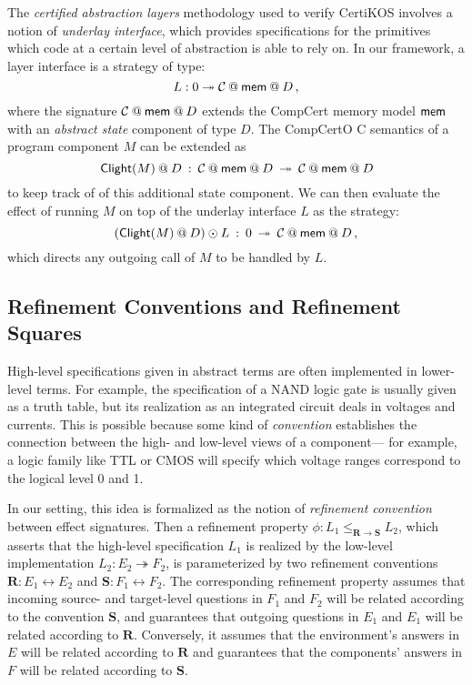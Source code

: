 \begin{example} \label{ex:calcomp} %
The \emph{certified abstraction layers} methodology used to verify CertiKOS
involves a notion of \emph{underlay interface},
which provides specifications for the primitives which
code at a certain level of abstraction is able to rely on.
In our framework, a layer interface is a strategy of type:
\[
  L : \emptysig \twoheadrightarrow \mathcal{C} \mathbin@ \kw{mem} \mathbin@ D
  \,,
\]
where the signature $\mathcal{C} \mathbin@ \kw{mem} \mathbin@ D$
extends the CompCert memory model $ \mathsf{mem} $
with an \emph{abstract state} component of type $D$.
The CompCertO C semantics of a program component $M$ can be extended as
\[
  \kw{Clight}(M) \mathbin@ D \: : \:
    \mathcal{C} \mathbin@ \kw{mem} \mathbin@ D \: \twoheadrightarrow \:
    \mathcal{C} \mathbin@ \kw{mem} \mathbin@ D
\]
to keep track of of this additional state component. 
We can then evaluate the effect of running $M$
on top of the underlay interface $L$ as the strategy:
\[
  (\kw{Clight}(M) \mathbin@ D) \odot L \: : \:
    \emptysig \: \twoheadrightarrow \:
    \mathcal{C} \mathbin@ \kw{mem} \mathbin@ D
    \,,
\]
which directs any outgoing call of $M$ to be handled by $L$.
\end{example}


\subsection{Refinement Conventions and Refinement Squares} \label{sec:sconv} %

High-level specifications given in abstract terms
are often implemented in lower-level terms.
For example, the specification of a NAND logic gate
is usually given as a truth table,
but its realization as an integrated circuit
deals in voltages and currents.
This is possible because some kind of \emph{convention}
establishes the connection between
the high- and low-level views of a component---%
for example, a logic family like TTL or CMOS
will specify which voltage ranges correspond
to the logical level 0 and 1.

In our setting, this idea is formalized
as the notion of \emph{refinement convention} between effect signatures.
Then a refinement property
$\phi : L_1 \le_{\mathbf{R} \rightarrow \mathbf{S}} L_2$,
which asserts that the high-level specification $L_1$
is realized by the low-level implementation $L_2 : E_2 \twoheadrightarrow F_2$,
is parameterized by two refinement conventions
$\mathbf{R} : E_1 \leftrightarrow E_2$ and
$\mathbf{S} : F_1 \leftrightarrow F_2$.
The corresponding refinement property assumes that incoming
source- and target-level questions in $F_1$ and $F_2$
will be related according to the convention $\mathbf{S}$,
and guarantees that outgoing questions in $E_1$ and $E_1$
will be related according to $\mathbf{R}$.
Conversely, it assumes that
the environment's answers in $E$
will be related according to $\mathbf{R}$
and guarantees that the components' answers in $F$
will be related according to $\mathbf{S}$.

